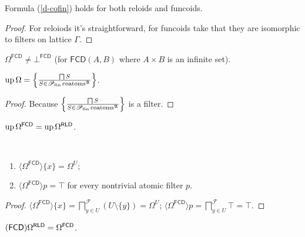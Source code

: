 \begin{cor}
  Formula (\ref{d-cofin}) holds for both reloids and funcoids.
\end{cor}

\begin{proof}
  For reloiods it's straightforward, for funcoids take that they are
  isomorphic to filters on lattice $\Gamma$.
\end{proof}

\begin{cor}
$\Omega^{\mathsf{FCD}} \ne \bot^{\mathsf{FCD}}$ (for $\mathsf{FCD}(A,B)$ where $A\times B$ is an infinite set).
\end{cor}


\begin{prop}
  $\operatorname{up} \Omega = \left\{ \frac{ \bigsqcap S }{ S \in
  \mathscr{P}_{\operatorname{fin}} \operatorname{coatoms}^{\mathfrak{A}} }\right\}$.
\end{prop}

\begin{proof}
  Because $\left\{ \frac{ \bigsqcap S }{ S \in
  \mathscr{P}_{\operatorname{fin}} \operatorname{coatoms}^{\mathfrak{A}} }\right\}$ is a
  filter.
\end{proof}

\begin{cor}
  $\operatorname{up} \Omega^{\mathsf{FCD}} = \operatorname{up}
  \Omega^{\mathsf{RLD}}$.
\end{cor}

\begin{prop}
  ~  
  \begin{enumerate}
    \item $\langle \Omega^{\mathsf{FCD}} \rangle \{ x \} = \Omega^U$;
    
    \item $\langle \Omega^{\mathsf{FCD}} \rangle p = \top$ for every
    nontrivial atomic filter $p$.
  \end{enumerate}
\end{prop}

\begin{proof}
  $\langle \Omega^{\mathsf{FCD}} \rangle \{ x \} =
  \bigsqcap^{\mathscr{F}}_{y \in U} (U \setminus \{ y \}) = \Omega^U$;
  $\langle \Omega^{\mathsf{FCD}} \rangle p = \bigsqcap^{\mathscr{F}}_{y
  \in U} \top = \top$.
\end{proof}

\begin{prop}
  $(\mathsf{FCD}) \Omega^{\mathsf{RLD}} =
  \Omega^{\mathsf{FCD}}$.
\end{prop}

